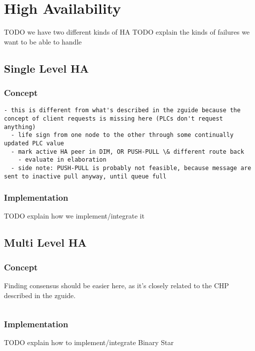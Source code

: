 \chapter{High Availability}\label{ch:ha}

TODO we have two different kinds of HA
TODO explain the kinds of failures we want to be able to handle

\section{Single Level HA}
\subsection{Concept}
\begin{lstlisting}[style=customsh]
  - this is different from what's described in the zguide because the concept of client requests is missing here (PLCs don't request anything)
  - life sign from one node to the other through some continually updated PLC value
  - mark active HA peer in DIM, OR PUSH-PULL \& different route back
    - evaluate in elaboration
  - side note: PUSH-PULL is probably not feasible, because message are sent to inactive pull anyway, until queue full
\end{lstlisting}

\subsection{Implementation}
TODO explain how we implement/integrate it


\section{Multi Level HA}
\subsection{Concept}
Finding consensus should be easier here, as it's closely related to the CHP described in the zguide.
\begin{lstlisting}[style=customsh]
\end{lstlisting}


\subsection{Implementation}
TODO explain how to implement/integrate Binary Star

